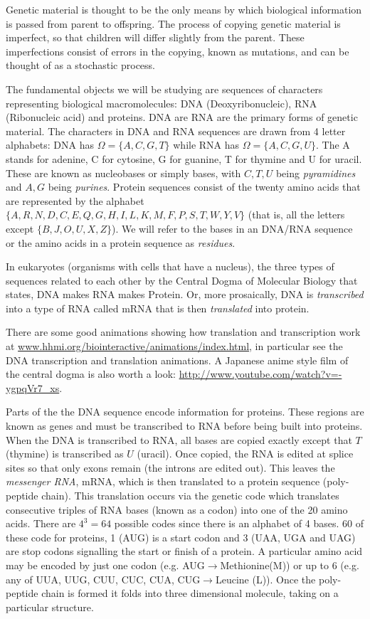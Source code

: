 \documentclass[11pt]{article}
\begin{document}
Genetic material is thought to be the only means by which biological information is passed from parent to offspring.  The process of copying genetic material is imperfect, so that children will differ slightly from the parent.  These imperfections consist of errors in the copying, known as mutations, and can be thought of as a stochastic process.

The fundamental objects we will be studying are sequences of characters representing biological macromolecules: DNA (Deoxyribonucleic),   RNA  (Ribonucleic acid) and proteins.  DNA are RNA are the primary forms of genetic material.    The characters in DNA and RNA sequences are drawn from 4 letter alphabets: DNA has $\Omega = \{A,C,G,T \}$ while RNA has $\Omega = \{A,C,G,U \}$.  The A stands for adenine, C for cytosine, G for guanine, T for thymine and U for uracil. These are known as nucleobases or simply bases, with $C,T,U$ being {\em pyramidines } and $A,G$ being {\em purines}.    Protein sequences consist of the twenty amino acids that are represented by the alphabet $\{ A,R,N,D,C,E,Q,G,H,I,L,K,M,F,P,S,T,W,Y,V\}$ (that is, all the letters except $\{ B,J,O,U,X,Z \}$). We will refer to the bases in an DNA/RNA sequence or the amino acids in a protein sequence as {\em residues}. 

In eukaryotes (organisms with cells that  have a nucleus), the three types of sequences related to each other by the Central Dogma of  Molecular Biology that states, DNA makes RNA makes Protein.  Or, more prosaically,   DNA is {\em transcribed} into a type of RNA called mRNA that is then {\em translated} into protein.  

There are some good animations showing how translation and transcription work at \url{www.hhmi.org/biointeractive/animations/index.html}, in particular see the DNA transcription and translation animations.  A Japanese anime style film of the central dogma is also worth a look: \url{http://www.youtube.com/watch?v=-ygpqVr7_xs}. 

Parts of the the DNA sequence encode information for proteins.  These regions are known as genes and must be transcribed to RNA before being built into proteins.  When the DNA is transcribed to RNA, all bases are copied exactly except that $T$ (thymine) is transcribed as $U$ (uracil).  Once copied, the RNA is edited at splice sites so that only exons remain (the introns are edited out).  This leaves the {\em messenger RNA}, mRNA, which is then  translated to a protein sequence (poly-peptide chain).  This translation  occurs via the genetic code which translates consecutive triples of RNA bases (known as a codon) into one of the 20 amino acids.  There are $4^3 = 64$ possible codes since there is an alphabet of 4 bases.  60 of these code for proteins, 1 (AUG) is a start codon and 3 (UAA, UGA and UAG) are stop codons signalling the start or finish of a protein.  A particular  amino acid may be encoded by just one codon (e.g. AUG$\rightarrow$Methionine(M)) or up to 6 (e.g. any of  UUA, UUG, CUU, CUC, CUA, CUG$\rightarrow$Leucine (L)).    Once the poly-peptide chain is formed it folds into three dimensional molecule, taking on a particular structure.
\end{document}

